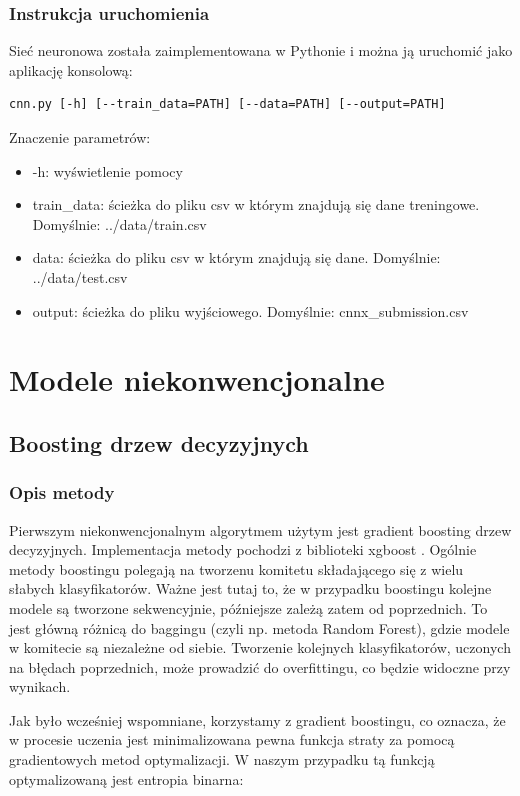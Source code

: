 \documentclass[12pt]{article}
\begin{document}
\subsubsection{Instrukcja uruchomienia}
Sieć neuronowa została zaimplementowana w Pythonie i można ją uruchomić jako aplikację konsolową:
\begin{lstlisting}
cnn.py [-h] [--train_data=PATH] [--data=PATH] [--output=PATH]
\end{lstlisting}
Znaczenie parametrów:

\begin{itemize}
    \item -h: wyświetlenie pomocy
    \item train{\_}data: ścieżka do pliku csv w którym znajdują się dane treningowe. Domyślnie: ../data/train.csv
    \item data: ścieżka do pliku csv w którym znajdują się dane. Domyślnie: ../data/test.csv
    \item output: ścieżka do pliku wyjściowego. Domyślnie: cnnx{\_}submission.csv
\end{itemize}

\section{Modele niekonwencjonalne}

\subsection{Boosting drzew decyzyjnych}

\subsubsection{Opis metody}

Pierwszym niekonwencjonalnym algorytmem użytym jest gradient boosting drzew decyzyjnych. Implementacja metody pochodzi z biblioteki xgboost \cite{xgboost}. Ogólnie metody boostingu polegają na tworzenu komitetu składającego się z wielu słabych klasyfikatorów. Ważne jest tutaj to, że w przypadku boostingu kolejne modele są tworzone sekwencyjnie, późniejsze zależą zatem od poprzednich. To jest główną różnicą do baggingu (czyli np. metoda Random Forest), gdzie modele w komitecie są niezależne od siebie. Tworzenie kolejnych klasyfikatorów, uczonych na błędach poprzednich, może prowadzić do overfittingu, co będzie widoczne przy wynikach.

Jak było wcześniej wspomniane, korzystamy z gradient boostingu, co oznacza, że w procesie uczenia jest minimalizowana pewna funkcja straty za pomocą gradientowych metod optymalizacji. W naszym przypadku tą funkcją optymalizowaną jest entropia binarna:
\end{document}
